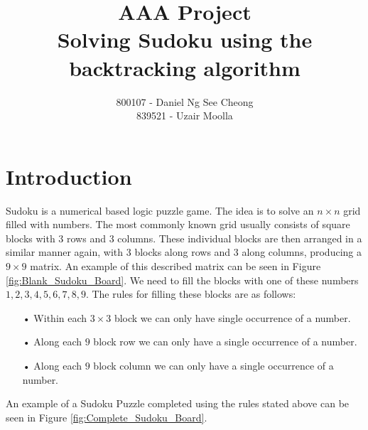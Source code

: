 \documentclass[12pt,a4paper,titlepage]{article}
\author{800107 - Daniel Ng See Cheong\\
		839521 - Uzair Moolla}
\title{
	AAA Project\\
	\large Solving Sudoku using the backtracking algorithm
}
\begin{document}
\maketitle

\section{Introduction}
Sudoku is a numerical based logic puzzle game. The idea is to solve an $n\times n$ grid filled with numbers. The most commonly known grid usually consists of square blocks with 3 rows and 3 columns. These individual blocks are then arranged in a similar manner again, with 3 blocks along rows and 3 along columns, producing a $9 \times 9$ matrix. An example of this described matrix can be seen in Figure  \ref{fig:Blank_Sudoku_Board}. We need to fill the blocks with one of these numbers ${1,2,3,4,5,6,7,8,9}$. The rules for filling these blocks are as follows:
\begin{itemize}
\item[•] Within each $3 \times 3 $ block we can only have single occurrence of a number.
\item[•] Along each $9$ block row we can only have a single occurrence of a number.
\item[•] Along each $9$ block column we can only have a single occurrence of a number.
\end{itemize}

\noindent
An example of a Sudoku Puzzle completed using the rules stated above can be seen in Figure \ref{fig:Complete_Sudoku_Board}.
\end{document}
